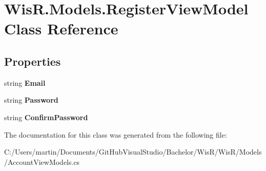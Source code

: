 \hypertarget{class_wis_r_1_1_models_1_1_register_view_model}{}\section{Wis\+R.\+Models.\+Register\+View\+Model Class Reference}
\label{class_wis_r_1_1_models_1_1_register_view_model}
\subsection*{Properties}
\begin{DoxyCompactItemize}
\item 
\hypertarget{class_wis_r_1_1_models_1_1_register_view_model_ad8746abb584459f06084ca04c6a24a7c}{}string {\bfseries Email}\label{class_wis_r_1_1_models_1_1_register_view_model_ad8746abb584459f06084ca04c6a24a7c}

\item 
\hypertarget{class_wis_r_1_1_models_1_1_register_view_model_af480a3c755f812604c29dd5d3ff7a329}{}string {\bfseries Password}\label{class_wis_r_1_1_models_1_1_register_view_model_af480a3c755f812604c29dd5d3ff7a329}

\item 
\hypertarget{class_wis_r_1_1_models_1_1_register_view_model_a7c687390fbe406474ddc90eb78ff35dc}{}string {\bfseries Confirm\+Password}\label{class_wis_r_1_1_models_1_1_register_view_model_a7c687390fbe406474ddc90eb78ff35dc}

\end{DoxyCompactItemize}


The documentation for this class was generated from the following file\+:\begin{DoxyCompactItemize}
\item 
C\+:/\+Users/martin/\+Documents/\+Git\+Hub\+Visual\+Studio/\+Bachelor/\+Wis\+R/\+Wis\+R/\+Models/Account\+View\+Models.\+cs\end{DoxyCompactItemize}
